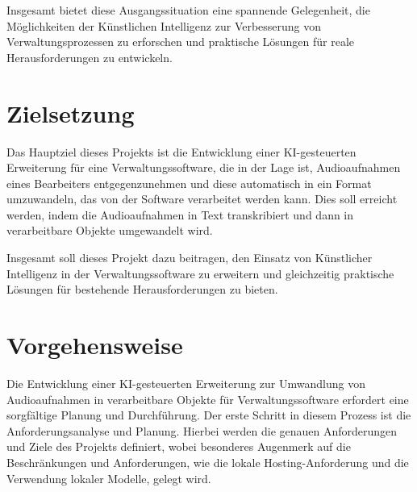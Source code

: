 \documentclass[12pt,a4paper,parskip=full]{scrartcl}
\begin{document}
Insgesamt bietet diese Ausgangssituation eine spannende Gelegenheit, die Möglichkeiten der Künstlichen Intelligenz zur Verbesserung von Verwaltungsprozessen zu erforschen und praktische Lösungen für reale Herausforderungen zu entwickeln.

\section*{Zielsetzung}
Das Hauptziel dieses Projekts ist die Entwicklung einer KI-gesteuerten Erweiterung für eine Verwaltungssoftware, die in der Lage ist, Audioaufnahmen eines Bearbeiters entgegenzunehmen und diese automatisch in ein Format umzuwandeln, das von der Software verarbeitet werden kann.
Dies soll erreicht werden, indem die Audioaufnahmen in Text transkribiert und dann in verarbeitbare Objekte umgewandelt wird.




Insgesamt soll dieses Projekt dazu beitragen, den Einsatz von Künstlicher Intelligenz in der Verwaltungssoftware zu erweitern und gleichzeitig praktische Lösungen für bestehende Herausforderungen zu bieten.

\section*{Vorgehensweise}
Die Entwicklung einer KI-gesteuerten Erweiterung zur Umwandlung von Audioaufnahmen in verarbeitbare Objekte für Verwaltungssoftware erfordert eine sorgfältige Planung und Durchführung.
Der erste Schritt in diesem Prozess ist die Anforderungsanalyse und Planung.
Hierbei werden die genauen Anforderungen und Ziele des Projekts definiert, wobei besonderes Augenmerk auf die Beschränkungen und Anforderungen, wie die lokale Hosting-Anforderung und die Verwendung lokaler Modelle, gelegt wird.
\end{document}
